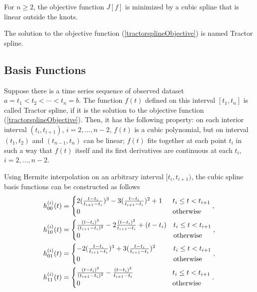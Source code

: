 \begin{theorem}
For $n\geq2$, the objective function $J[f]$ is minimized by a cubic spline that is linear outside the knots.
\end{theorem}
The solution to the objective function (\ref{tractorsplineObjective}) is named Tractor spline. 


\subsection{Basis Functions}
Suppose there is a time series sequence of observed dataset $a=t_1<t_2<\cdots<t_n=b$. The function $f(t)$ %
defined on this interval $[t_1,t_n]$ is called Tractor spline, if it is the solution to the objective function (\ref{tractorsplineObjective}). Then, it has the following property: on each interior interval $(t_i,t_{i+1})$, $i=2,\ldots,n-2$, $f(t)$ is a cubic polynomial, but on interval $(t_1,t_2)$ and $(t_{n-1},t_n)$ can be linear; $f(t)$ fits together at each point $t_i$ in such a way that $f(t)$ itself and its first derivatives are continuous at each $t_i$,  $i=2,\ldots,n-2$. 

Using Hermite interpolation on an arbitrary interval $[t_i,t_{i+1} ) $, the cubic spline basis functions can be constructed as follows
\begin{align}\label{hermitebasis1}
& h_{00}^{(i)}(t)=
\begin{cases}
2(\frac{t-t_{i}}{t_{i+1}-t_{i}})^3-3(\frac{t-t_{i}}{t_{i+1}-t_{i}})^2+1 \hphantom{1} & t_i\leq t<t_{i+1} \\ 
0 & \mbox{otherwise}
\end{cases}, \\
& h_{10}^{(i)}(t)=\begin{cases}
\frac{(t-t_{i})^3}{(t_{i+1}-t_{i})^2}-2\frac{(t-t_{i})^2}{t_{i+1}-t_{i}}+(t-t_{i})   & t_i\leq t<t_{i+1} \\ 
0 &   \mbox{otherwise}
\end{cases},\\
& h_{01}^{(i)}(t)=
\begin{cases}
-2(\frac{t-t_i}{t_{i+1}-t_i})^3+3(\frac{t-t_i}{t_{i+1}-t_i})^2 \hphantom{+1.} & t_i\leq t<t_{i+1} \\ 
0 &   \mbox{otherwise}
\end{cases},\\
& h_{11}^{(i)}(t)=\begin{cases}
\frac{(t-t_i)^3}{(t_{i+1}-t_i)^2}-\frac{(t-t_i)^2}{t_{i+1}-t_i}  \hphantom{+t-123-}  & t_i\leq t<t_{i+1} \\ 
0 &   \mbox{otherwise}
\end{cases}.
\end{align}


